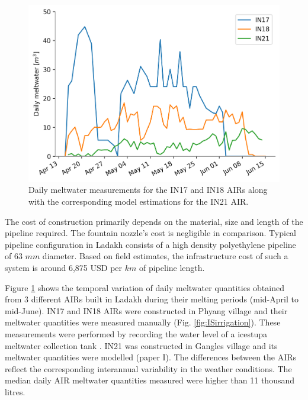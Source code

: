 \begin{figure}[htb]
	\centering
	\includegraphics[width=\textwidth]{figs/melt.png}
	\caption{Daily meltwater measurements for the IN17 and IN18 AIRs along with the corresponding model estimations
		for the IN21 AIR. }
	\label{fig:ISmelt}
\end{figure}

The cost of construction primarily depends on the material, size and length of the pipeline required. The
fountain nozzle's cost is negligible in comparison. Typical pipeline configuration in Ladakh consists of a high
density polyethylene pipeline of 63 $mm$ diameter. Based on field estimates, the infrastructure cost of such a
system is around 6,875 USD per $km$ of pipeline length. 


Figure \ref{fig:ISmelt} shows the temporal variation of daily meltwater quantities obtained from 3 different
AIRs built in Ladakh during their melting periods (mid-April to mid-June). IN17 and IN18 AIRs were constructed
in Phyang village and their meltwater quantities were measured manually (Fig. \ref{fig:ISirrigation}). These
measurements were performed by recording the water level of a icestupa meltwater collection tank
\citep{vermaIceStupaMeltwater2018}. IN21 was constructed in Gangles village and its meltwater quantities
were modelled (paper I). The differences between the AIRs reflect the corresponding interannual variability in the weather
conditions. The median daily AIR meltwater quantities measured were higher than 11 thousand litres.


